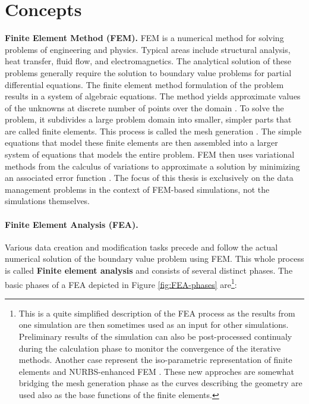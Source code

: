 \section{Concepts}




\textbf{Finite Element Method (FEM).} FEM is a numerical method for solving problems of engineering and physics. Typical areas include structural analysis, heat transfer, fluid flow, and electromagnetics. The analytical solution of these problems generally require the solution to boundary value problems for partial differential equations. The finite element method formulation of the problem results in a system of algebraic equations. The method yields approximate values of the unknowns at discrete number of points over the domain \cite{XXX}. To solve the problem, it subdivides a large problem domain into smaller, simpler parts that are called finite elements. This process is called the mesh generation \cite{XXX}. The simple equations that model these finite elements are then assembled into a larger system of equations that models the entire problem. FEM then uses variational methods from the calculus of variations to approximate a solution by minimizing an associated error function \cite{XXX}. The focus of this thesis is exclusively on the data management problems in the context of FEM-based simulations, not the simulations themselves.


\paragraph{Finite Element Analysis (FEA).} Various data creation and modification tasks precede and follow the actual numerical solution of the boundary value problem using FEM. This whole process is called \textbf{Finite element analysis} and consists of several distinct phases. The basic phases of a FEA depicted in Figure \ref{fig:FEA-phases} are\footnote{This is a quite simplified description of the FEA process as the results from one simulation are then sometimes used as an input for other simulations. Preliminary results of the simulation can also be post-processed continualy during the calculation phase to monitor the convergence of the iterative methods. Another case represent the iso-parametric representation of finite elements \cite{XXX} and NURBS-enhanced FEM \cite{XXX}. These new approches are somewhat bridging the mesh generation phase as the curves describing the geometry are used also as the base functions of the finite elements.}:

